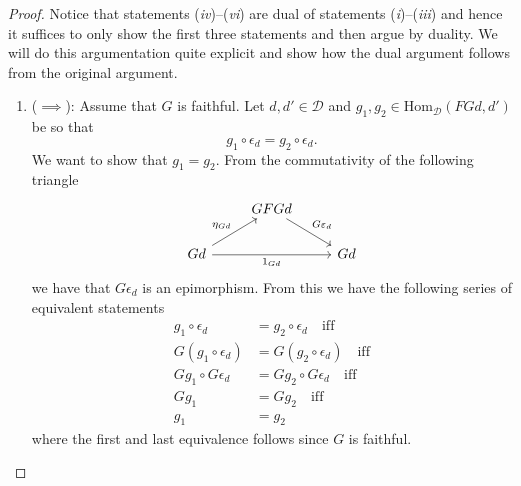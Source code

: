 \begin{proof}
  Notice that statements (\textit{iv})--(\textit{vi}) are dual of statements (\textit{i})--(\textit{iii}) and hence it suffices to only show the first three statements and then argue by duality. We will do this argumentation quite explicit and show how the dual argument follows from the original argument.
  \begin{enumerate}[label=(\roman*)]
    \item ($ \implies $): Assume that $ G $ is faithful. Let $ d,d' \in \mathcal{D} $ and $ g_1, g_2 \in \text{Hom}_{\mathcal{D}}(FGd, d') $ be so that
      \begin{equation}
        g_1 \circ \epsilon_d = g_2 \circ \epsilon_d
      .\end{equation}
      We want to show that $ g_1 = g_2 $. From the commutativity of the following triangle
      \[\begin{tikzcd}
	& GFGd \\
	      Gd && Gd
	      \arrow["{G\varepsilon_{d}}", from=1-2, to=2-3]
	      \arrow["{\eta_{Gd}}", from=2-1, to=1-2]
	      \arrow["{1_{Gd}}"', from=2-1, to=2-3]
      \end{tikzcd}\]
      we have that $ G\epsilon_d $ is an epimorphism. From this we have the following series of equivalent statements
      \begin{align*}
        g_1 \circ \epsilon_d &= g_2 \circ \epsilon_d \quad \text{iff} \\
        G(g_1 \circ \epsilon_d) &= G(g_2 \circ \epsilon_d) \quad \text{iff} \\
        Gg_1 \circ G\epsilon_d &= Gg_2 \circ G\epsilon_d\quad \text{iff} \\
        Gg_1 &= Gg_2 \quad \text{iff} \\
        g_1 &= g_2
      \end{align*}
      where the first and last equivalence follows since $ G $ is faithful.


\end{enumerate}
\end{proof}
